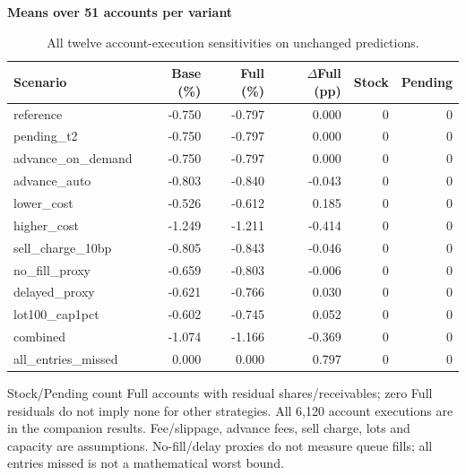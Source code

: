 \begin{table}[!htbp]
\centering\small
\setlength{\tabcolsep}{3pt}
\renewcommand{\arraystretch}{1.15}
\caption{All twelve account-execution sensitivities on unchanged predictions.}
\label{tab:execution}
\textbf{Means over 51 accounts per variant}\par\smallskip
\begin{tabular}{lrrrrr}
\hline
Scenario & Base (\%) & Full (\%) & $\Delta$Full (pp) & Stock & Pending \\
\hline
reference & -0.750 & -0.797 & 0.000 & 0 & 0 \\
pending\_t2 & -0.750 & -0.797 & 0.000 & 0 & 0 \\
advance\_on\_demand & -0.750 & -0.797 & 0.000 & 0 & 0 \\
advance\_auto & -0.803 & -0.840 & -0.043 & 0 & 0 \\
lower\_cost & -0.526 & -0.612 & 0.185 & 0 & 0 \\
higher\_cost & -1.249 & -1.211 & -0.414 & 0 & 0 \\
sell\_charge\_10bp & -0.805 & -0.843 & -0.046 & 0 & 0 \\
no\_fill\_proxy & -0.659 & -0.803 & -0.006 & 0 & 0 \\
delayed\_proxy & -0.621 & -0.766 & 0.030 & 0 & 0 \\
lot100\_cap1pct & -0.602 & -0.745 & 0.052 & 0 & 0 \\
combined & -1.074 & -1.166 & -0.369 & 0 & 0 \\
all\_entries\_missed & 0.000 & 0.000 & 0.797 & 0 & 0 \\
\hline
\end{tabular}\par\medskip
\begin{minipage}{\textwidth}\footnotesize Stock/Pending count Full accounts with residual shares/receivables; zero Full residuals do not imply none for other strategies. All 6,120 account executions are in the companion results. Fee/slippage, advance fees, sell charge, lots and capacity are assumptions. No-fill/delay proxies do not measure queue fills; all entries missed is not a mathematical worst bound.\end{minipage}
\end{table}
